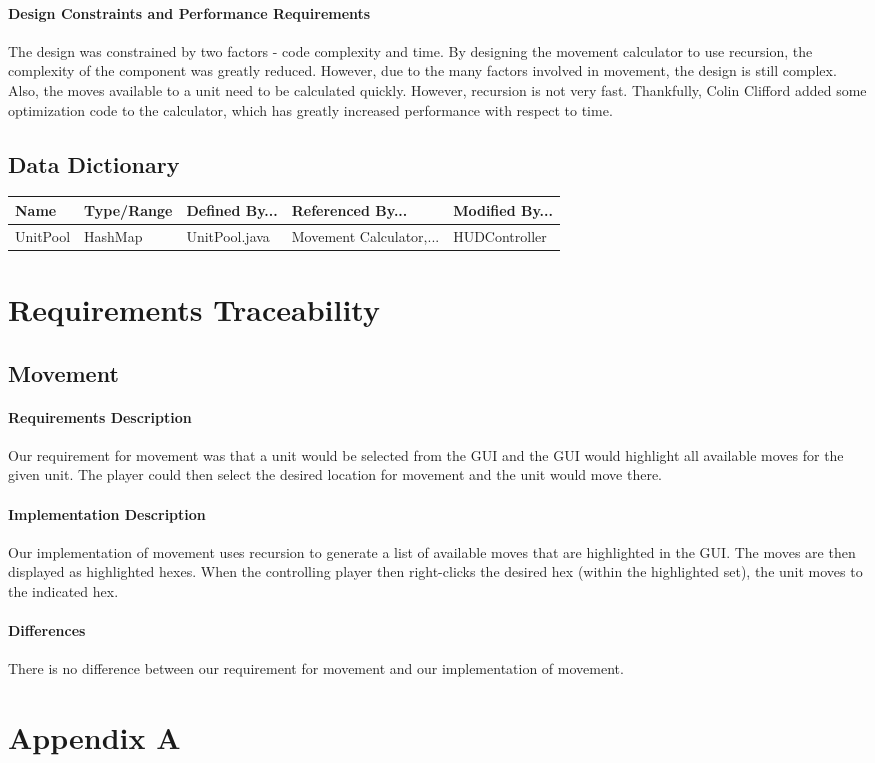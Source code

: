 			\paragraph{Design Constraints and Performance Requirements} The design was constrained by two factors - code complexity and time. By designing the movement calculator to use recursion, the complexity of the component was greatly reduced. However, due to the many factors involved in movement, the design is still complex. Also, the moves available to a unit need to be calculated quickly. However, recursion is not very fast. Thankfully, Colin Clifford added some optimization code to the calculator, which has greatly increased performance with respect to time.
	\subsection{Data Dictionary}
\small{
\begin{center}
\noindent\begin{tabularx}{\linewidth}{|X|X|X|X|X|}\hline
\textbf{Name} & \textbf{Type/Range} & \textbf{Defined By...} & \textbf{Referenced By...} & \textbf{Modified By...}\\
\hline
UnitPool & HashMap & UnitPool.java & Movement Calculator,... & HUDController\\
\hline
\end{tabularx}
\end{center}
}
\section{Requirements Traceability}
	\subsection{Movement}
		\paragraph{Requirements Description} Our requirement for movement was that a unit would be selected from the GUI and the GUI would highlight all available moves for the given unit. The player could then select the desired location for movement and the unit would move there.
		\paragraph{Implementation Description} Our implementation of movement uses recursion to generate a list of available moves that are highlighted in the GUI. The moves are then displayed as highlighted hexes. When the controlling player then right-clicks the desired hex (within the highlighted set), the unit moves to the indicated hex. 
		\paragraph{Differences} There is no difference between our requirement for movement and our implementation of movement.
\section{Appendix A}


